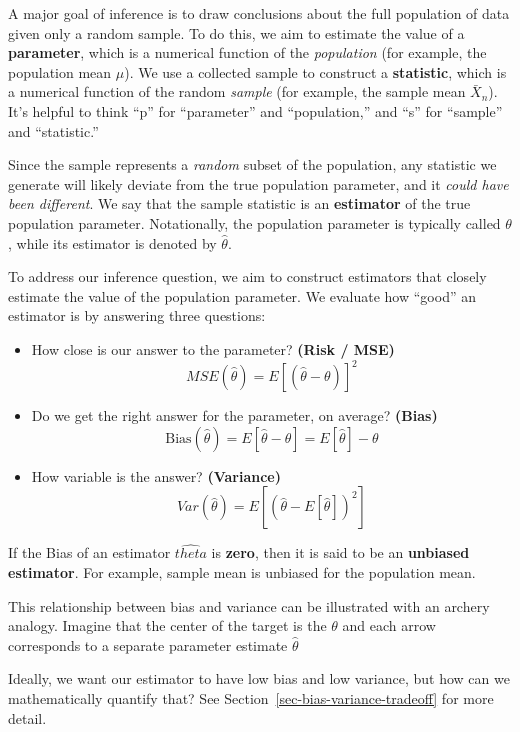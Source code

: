 \documentclass[
  letterpaper,
  DIV=11,
  numbers=noendperiod]{scrreprt}
\providecommand{\tightlist}{%
  \setlength{\itemsep}{0pt}\setlength{\parskip}{0pt}}\usepackage{longtable,booktabs,array}
\begin{document}
A major goal of inference is to draw conclusions about the full
population of data given only a random sample. To do this, we aim to
estimate the value of a \textbf{parameter}, which is a numerical
function of the \emph{population} (for example, the population mean
\(\mu\)). We use a collected sample to construct a \textbf{statistic},
which is a numerical function of the random \emph{sample} (for example,
the sample mean \(\bar{X}_n\)). It's helpful to think ``p'' for
``parameter'' and ``population,'' and ``s'' for ``sample'' and
``statistic.''

Since the sample represents a \emph{random} subset of the population,
any statistic we generate will likely deviate from the true population
parameter, and it \emph{could have been different}. We say that the
sample statistic is an \textbf{estimator} of the true population
parameter. Notationally, the population parameter is typically called
\(\theta\), while its estimator is denoted by \(\hat{\theta}\).

To address our inference question, we aim to construct estimators that
closely estimate the value of the population parameter. We evaluate how
``good'' an estimator is by answering three questions:

\begin{itemize}
\tightlist
\item
  How close is our answer to the parameter? \textbf{(Risk / MSE)}
  \[ MSE(\hat{\theta}) = E[(\hat{\theta} - \theta)]^2\]
\item
  Do we get the right answer for the parameter, on average?
  \textbf{(Bias)}
  \[\text{Bias}(\hat{\theta}) = E[\hat{\theta} - \theta] = E[\hat{\theta}] - \theta\]
\item
  How variable is the answer? \textbf{(Variance)}
  \[Var(\hat{\theta}) = E[(\hat{\theta} - E[\hat{\theta}])^2] \]
\end{itemize}

If the Bias of an estimator \(\hat{theta}\) is \textbf{zero}, then it is
said to be an \textbf{unbiased estimator}. For example, sample mean is
unbiased for the population mean.

This relationship between bias and variance can be illustrated with an
archery analogy. Imagine that the center of the target is the \(\theta\)
and each arrow corresponds to a separate parameter estimate
\(\hat{\theta}\)

Ideally, we want our estimator to have low bias and low variance, but
how can we mathematically quantify that? See
Section~\ref{sec-bias-variance-tradeoff} for more detail.
\end{document}
